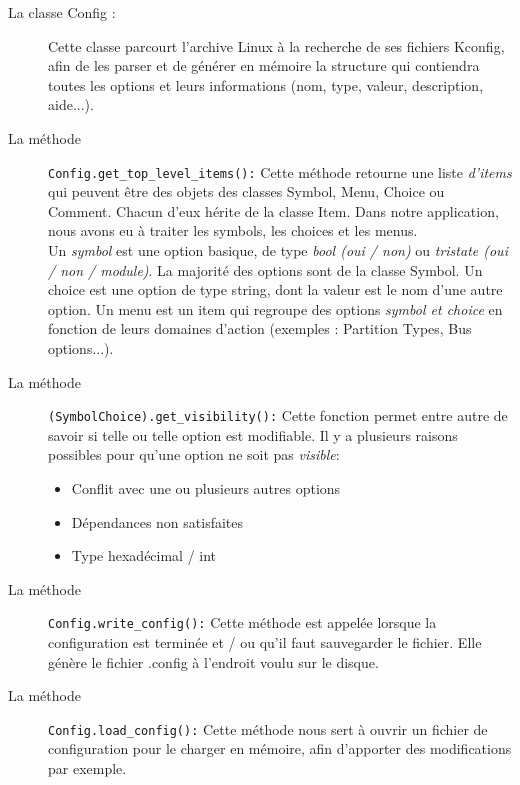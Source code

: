 \documentclass[17pts]{report}
\begin{document}
    \begin{description}
        \item[La classe Config :] Cette classe parcourt l'archive Linux à la
            recherche de ses fichiers Kconfig, afin de les parser et de générer
            en mémoire la structure qui contiendra toutes les options et leurs
            informations (nom, type, valeur, description, aide...). \\

        \item[La méthode ] \verb|Config.get_top_level_items():| Cette méthode
            retourne une liste \textit{d'items} qui peuvent être des objets des
            classes Symbol, Menu, Choice ou Comment. Chacun d'eux hérite de la
            classe Item.  Dans notre application, nous avons eu à traiter les
            symbols, les choices et les menus.\\

            Un \textit{symbol} est une option basique, de type \textit{bool
            (oui / non)} ou \textit{tristate (oui / non / module)}. La majorité
            des options sont de la classe Symbol.  Un choice est une option de
            type string, dont la valeur est le nom d'une autre option.  Un menu
            est un item qui regroupe des options \textit{symbol et choice} en
            fonction de leurs domaines d'action (exemples : Partition Types,
            Bus options...).
        \item[La méthode ] \verb|(Symbol|\verb|Choice).get_visibility():| Cette
            fonction permet entre autre de savoir si telle ou telle option est
            modifiable. Il y a plusieurs raisons possibles pour qu'une option
            ne soit pas \textit{visible}:
            \begin{itemize}
                \item Conflit avec une ou plusieurs autres options
                \item Dépendances non satisfaites
                \item Type hexadécimal / int \newline
            \end{itemize}
        \item[La méthode ] \verb|Config.write_config():| Cette méthode est
            appelée lorsque la configuration est terminée et / ou qu'il faut
            sauvegarder le fichier. Elle génère le fichier .config à l'endroit
            voulu sur le disque. \newline
        \item[La méthode ] \verb|Config.load_config():| Cette méthode nous sert
            à ouvrir un fichier de configuration pour le charger en mémoire,
            afin d'apporter des modifications par exemple.
    \end{description}
\end{document}
